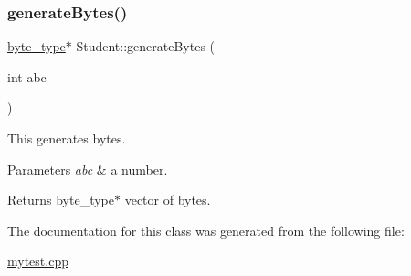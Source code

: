 \subsubsection{\texorpdfstring{generateBytes()}{generateBytes()}}
{\footnotesize\ttfamily \mbox{\hyperlink{mytest_8cpp_a714864ff21f0676254badf81106b3339}{byte\+\_\+type}}$\ast$ Student\+::generate\+Bytes (\begin{DoxyParamCaption}\item[{int}]{abc }\end{DoxyParamCaption})\hspace{0.3cm}{\ttfamily [inline]}}



This generates bytes. 


\begin{DoxyParams}{Parameters}
{\em abc} & a number.\\
\hline
\end{DoxyParams}
\begin{DoxyReturn}{Returns}
byte\+\_\+type$\ast$ vector of bytes. 
\end{DoxyReturn}


The documentation for this class was generated from the following file\+:\begin{DoxyCompactItemize}
\item 
\mbox{\hyperlink{mytest_8cpp}{mytest.\+cpp}}\end{DoxyCompactItemize}
